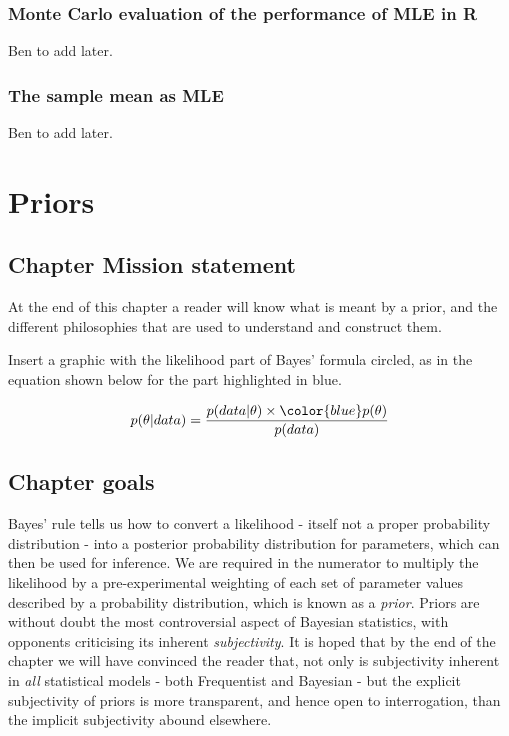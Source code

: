 \documentclass[11pt,fullpage]{book}
\begin{document}
\subsection{Monte Carlo evaluation of the performance of MLE in R}
Ben to add later.

\subsection{The sample mean as MLE}
Ben to add later.

\chapter{Priors}\label{chap:Prior}
\section{Chapter Mission statement}
At the end of this chapter a reader will know what is meant by a prior, and the different philosophies that are used to understand and construct them. 

Insert a graphic with the likelihood part of Bayes' formula circled, as in the equation shown below for the part highlighted in blue.

\begin{equation}
p(\theta|data) = \frac{p(data|\theta)\times {\color{blue}p(\theta)}}{p(data)}
\end{equation}\label{eq:Prior_BayesHighlighted}

\section{Chapter goals}
Bayes' rule tells us how to convert a likelihood - itself not a proper probability distribution - into a posterior probability distribution for parameters, which can then be used for inference. We are required in the numerator to multiply the likelihood by a pre-experimental weighting of each set of parameter values described by a probability distribution, which is known as a \textit{prior}. Priors are without doubt the most controversial aspect of Bayesian statistics, with opponents criticising its inherent \textit{subjectivity}. It is hoped that by the end of the chapter we will have convinced the reader that, not only is subjectivity inherent in \textit{all} statistical models - both Frequentist and Bayesian - but the explicit subjectivity of priors is more transparent, and hence open to interrogation, than the implicit subjectivity abound elsewhere.
\end{document}
